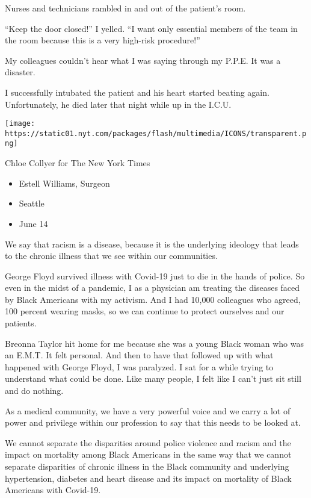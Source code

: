 Nurses and technicians rambled in and out of the patient's room.

``Keep the door closed!'' I yelled. ``I want only essential members of
the team in the room because this is a very high-risk procedure!''

My colleagues couldn't hear what I was saying through my P.P.E. It was a
disaster.

I successfully intubated the patient and his heart started beating
again. Unfortunately, he died later that night while up in the I.C.U.

\texttt{[image: https://static01.nyt.com/packages/flash/multimedia/ICONS/transparent.png]}

Chloe Collyer for The New York Times

\begin{itemize}
\tightlist
\item
  Estell Williams, Surgeon
\item
  Seattle
\item
  June 14
\end{itemize}

We say that racism is a disease, because it is the underlying ideology
that leads to the chronic illness that we see within our communities.

George Floyd survived illness with Covid-19 just to die in the hands of
police. So even in the midst of a pandemic, I as a physician am treating
the diseases faced by Black Americans with my activism. And I had 10,000
colleagues who agreed, 100 percent wearing masks, so we can continue to
protect ourselves and our patients.

Breonna Taylor hit home for me because she was a young Black woman who
was an E.M.T. It felt personal. And then to have that followed up with
what happened with George Floyd, I was paralyzed. I sat for a while
trying to understand what could be done. Like many people, I felt like I
can't just sit still and do nothing.

As a medical community, we have a very powerful voice and we carry a lot
of power and privilege within our profession to say that this needs to
be looked at.

We cannot separate the disparities around police violence and racism and
the impact on mortality among Black Americans in the same way that we
cannot separate disparities of chronic illness in the Black community
and underlying hypertension, diabetes and heart disease and its impact
on mortality of Black Americans with Covid-19.

